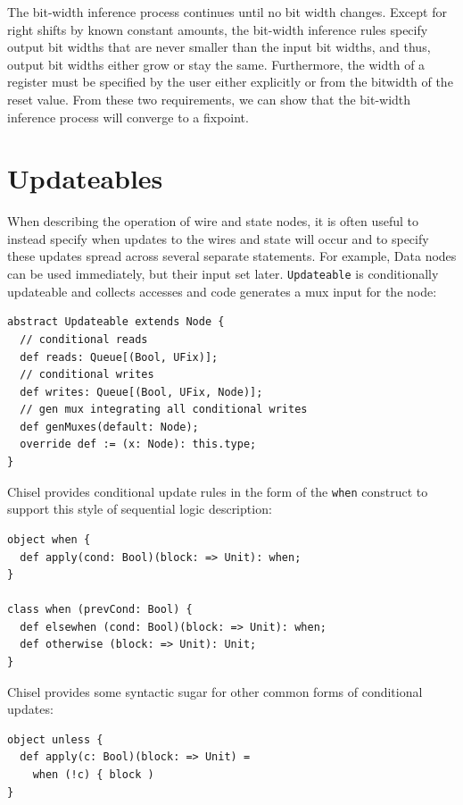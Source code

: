 \documentclass[10pt,twocolumn]{article}
\def\code#1{{\small\tt #1}}
\begin{document}
The bit-width inference process continues until no bit width changes.
Except for right shifts by known constant amounts, the bit-width
inference rules specify output bit widths that are never smaller than
the input bit widths, and thus, output bit widths either grow or stay
the same.  Furthermore, the width of a register must be specified by
the user either explicitly or from the bitwidth of the reset value.
From these two requirements, we can show that the bit-width inference
process will converge to a fixpoint.

\section{Updateables}

When describing the operation of wire and state
nodes, it is often useful to instead specify when updates to the
wires and state will occur and to specify these updates spread across
several separate statements.  
For example, Data nodes can be used immediately, but their input set later.
\code{Updateable} is conditionally updateable and 
collects accesses and code generates a mux input for the node:

\begin{lstlisting}
abstract Updateable extends Node {
  // conditional reads
  def reads: Queue[(Bool, UFix)];
  // conditional writes
  def writes: Queue[(Bool, UFix, Node)];
  // gen mux integrating all conditional writes
  def genMuxes(default: Node);
  override def := (x: Node): this.type;
}
\end{lstlisting}

Chisel provides conditional update rules
in the form of the \code{when} construct to support this style of
sequential logic description:
 
\begin{lstlisting}
object when {
  def apply(cond: Bool)(block: => Unit): when;
}

class when (prevCond: Bool) {
  def elsewhen (cond: Bool)(block: => Unit): when;
  def otherwise (block: => Unit): Unit;
}
\end{lstlisting}


Chisel provides some syntactic sugar for other common forms of
conditional updates:

\begin{lstlisting}
object unless {
  def apply(c: Bool)(block: => Unit) = 
    when (!c) { block )
}
\end{lstlisting}
\end{document}
